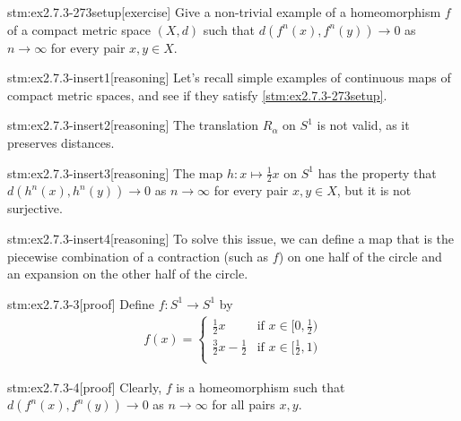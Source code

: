 
\begin{stm}{stm:ex2.7.3-273setup}[exercise]
Give a non-trivial example of a homeomorphism $f$ of a compact metric space $(X,d)$ such that $d(f^n(x), f^n(y)) \to 0$ as $n \to \infty$ for every pair $x,y \in X$.
\end{stm}


\begin{stm}{stm:ex2.7.3-insert1}[reasoning]
Let's recall simple examples of continuous maps of compact metric spaces, and see if they satisfy \ref{stm:ex2.7.3-273setup}.
\end{stm}

\begin{stm}{stm:ex2.7.3-insert2}[reasoning]
The translation $R_\alpha$ on $S^1$ is not valid, as it preserves distances.
\end{stm}

\begin{stm}{stm:ex2.7.3-insert3}[reasoning]
The map $h: x \mapsto \frac{1}{2}x$ on $S^1$ has the property that $d(h^n(x), h^n(y)) \to 0$ as $n \to \infty$ for every pair $x,y \in X$, but it is not surjective.
\end{stm}

\begin{stm}{stm:ex2.7.3-insert4}[reasoning]
To solve this issue, we can define a map that is the piecewise combination of a contraction (such as $f$) on one half of the circle and an expansion on the other half of the circle.
\end{stm}

\begin{stm}{stm:ex2.7.3-3}[proof]
Define $f: S^1 \to S^1$ by
\begin{align*}
f(x) = 
\begin{cases}
\frac{1}{2}x & \text{if } x \in [0, \frac{1}{2}) \\
\frac{3}{2}x - \frac{1}{2} & \text{if } x \in [\frac{1}{2}, 1) \\
\end{cases}
\end{align*}
\end{stm}

\begin{stm}{stm:ex2.7.3-4}[proof]
Clearly, $f$ is a homeomorphism such that $d(f^n(x), f^n(y)) \to 0$ as $n \to \infty$ for all pairs $x, y$.
\end{stm}

